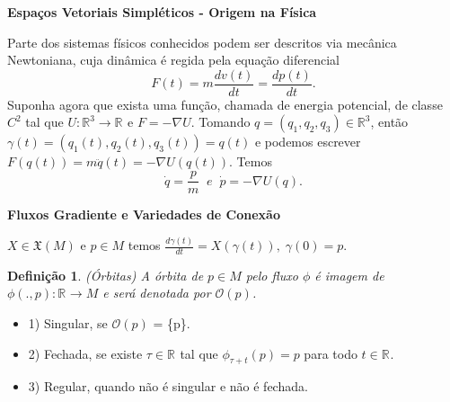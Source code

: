 \documentclass{beamer}
\newcommand{\titulo}[1]{\centering \textbf{#1}}
\newtheorem{definicao}[teorema]{Definição}
\newcommand{\campossuaves}[1]{\mathfrak{X}(#1)}
\newcommand{\derivada}[2]{\frac{d #1}{d #2}}
\newcommand{\orbitaponto}[1]{\mathcal{O}(#1)}
\newcommand{\real}[1]{\mathbb{R}^{#1}}
\newcommand{\reta}{\real{}}
\begin{document}
\begin{frame}
	\titulo{Espaços Vetoriais Simpléticos - Origem na Física}
	
	Parte dos sistemas físicos conhecidos podem ser descritos via mecânica Newtoniana, cuja dinâmica é regida pela equação diferencial 
	$$
	F(t) = m\derivada{v(t)}{t} = \derivada{p(t)}{t}.
	$$
	Suponha agora que exista uma função, chamada de energia potencial, de classe $C^{2}$ tal que $U:\real{3}\to \reta$ e $F = -\nabla U$. Tomando $q=(q_{1},q_{2}, q_{3})\in \real{3}$, então $\gamma(t)=(q_{1}(t),q_{2}(t), q_{3}(t)) = q(t)$ e podemos escrever $F(q(t)) =m \ddot{q}(t)= -\nabla U(q(t))$. Temos
	$$
	\dot{q} = \frac{p}{m} \;\; e \;\;\dot{p} = -\nabla U(q).
	$$	
\end{frame}

\begin{frame}
	\titulo{Fluxos Gradiente e Variedades de Conexão}
	
	$X \in \campossuaves{M}$ e $p \in M$
	temos $\derivada{\gamma(t)}{t} = X(\gamma(t)), \; \gamma(0) = p$.
	
	\begin{definicao}
		(Órbitas) A órbita de $p \in M$ pelo fluxo $\phi$ é imagem de $\phi(.,p):\reta\to M$ e será denotada por $\orbitaponto{p}$.
	\end{definicao}
	\begin{itemize}
			\item 1) Singular, se $\orbitaponto{p}$ = \{p\}.
			
			\item 2) Fechada, se existe $\tau \in \reta$ tal que $\phi_{\tau+t}(p) = p$ para todo $t \in \reta$.
			
			\item 3) Regular, quando não é singular e não é fechada.
	\end{itemize}
	
\end{frame}
\end{document}
